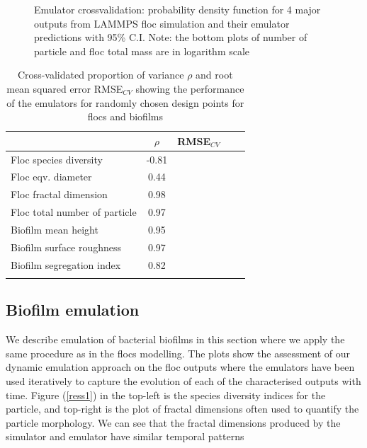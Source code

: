 \begin{figure}[!ht]
\begin{subfigure}[b]{.60\textwidth}
\end{subfigure}\vspace*{-.5em}
\caption[]{Emulator crossvalidation: probability density function for 4 major outputs from LAMMPS floc simulation and their emulator predictions with 95\% C.I. Note: the bottom plots of number of particle and floc total mass are in logarithm scale}\label{ress2}
\end{figure}


\begin{table}[!Ht]
\caption{Cross-validated proportion of variance $\rho$  and root mean squared error RMSE$_{CV}$ showing the performance of the emulators for randomly chosen design points for flocs and biofilms}
\label{alltab}
\begin{tabular}{lcccc}
\hline
&$\rho$& RMSE$_{CV}$\\
\hline
Floc species diversity&-0.81& \\
Floc eqv. diameter& 0.44 & \\
Floc fractal dimension & 0.98& \\
Floc total number of particle &0.97   &\\
Biofilm mean height &0.95   & &\\
Biofilm surface roughness &0.97   & &\\
Biofilm segregation index & 0.82 &&\\
\hline \vspace{-.2in}
\end{tabular}

\end{table}


\subsection{Biofilm emulation}
We describe emulation of bacterial biofilms in this section where we apply the same procedure as in the flocs modelling.
The plots show the assessment of our dynamic emulation approach on the floc outputs where the emulators have been used iteratively to capture the evolution of each of the characterised outputs with time. Figure (\ref{ress1}) in the top-left is the species diversity indices for the particle, and top-right is the plot of fractal dimensions often used to quantify the particle morphology.
We can see that the fractal dimensions produced by the simulator and emulator have similar temporal patterns

